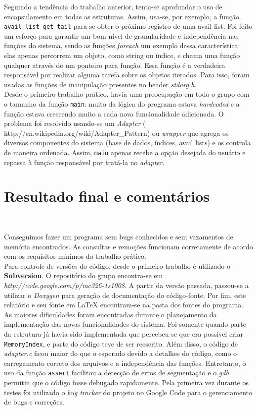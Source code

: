 \documentclass{article}
\begin{document}
Seguindo a tendência do trabalho anterior, tenta-se aprofundar o uso de encapsulamento em todas as estruturas. Assim, usa-se, por exemplo, a função \texttt{avail\_list\_get\_tail} para se obter o próximo registro de uma avail list. Foi feito um esforço para garantir um bom nível de granularidade e independência nas funções do sistema, sendo as funções \textit{foreach} um exemplo dessa característica: elas apenas percorrem um objeto, como string ou índice, e chama uma função qualquer através de um ponteiro para função. Essa função é a verdadeira responsável por realizar alguma tarefa sobre os objetos iterados. Para isso, foram usadas as funções de manipulação presentes no header \textit{stdarg.h}.\\

Desde o primeiro trabalho prático, havia uma preocupação em todo o grupo com o tamanho da função \texttt{main}: muito da lógica do programa estava \textit{hardcoded} e a função estava crescendo muito a cada nova funcionalidade adicionada. O problema foi resolvido usando-se um \textit{Adapter} (        http://en.wikipedia.org/wiki/Adapter\_Pattern) ou \textit{wrapper} que agrega os diversos componentes do sistema (base de dados, índices, avail lists) e os controla de maneira ordenada. Assim, \texttt{main} apenas recebe a opção desejada do usuário e repassa à função responsável por tratá-la no \textit{adapter}.

\section{Resultado final e comentários}\

Conseguimos fazer um programa sem bugs conhecidos e sem vazamentos de memória encontrados. As consultas e remoções funcionam corretamente de acordo com os requisitos mínimos do trabalho prático.\\

Para controle de versões do código, desde o primeiro trabalho é utilizado o \textbf{Subversion}. O repositório do grupo encontra-se em \textit{http://code.google.com/p/mc326-1s1008}. A partir da versão passada, passou-se a utilizar o \textit{Doxygen} para geração de documentação do código-fonte. Por fim, este relatório e seu fonte em LaTeX encontram-se na pasta dos fontes do programa.\\

As maiores dificuldades foram encontradas durante o planejamento da implementação das novas funcionalidades do sistema. Foi somente quando parte da estrutura já havia sido implementada que percebeu-se que era possível criar \texttt{MemoryIndex}, e parte do código teve de ser reescrito. Além disso, o código de \textit{adapter.c} ficou maior do que o esperado devido a detalhes do código, como o carregamento correto dos arquivos e a independência das funções. Entretanto, o uso da função \texttt{assert} facilitou a detecção de erros de segmentação e o \textit{gdb} permitiu que o código fosse debugado rapidamente. Pela primeira vez durante os testes foi utilizado o \textit{bug tracker} do projeto no Google Code para o gerenciamento de bugs e correções.\\
\end{document}
